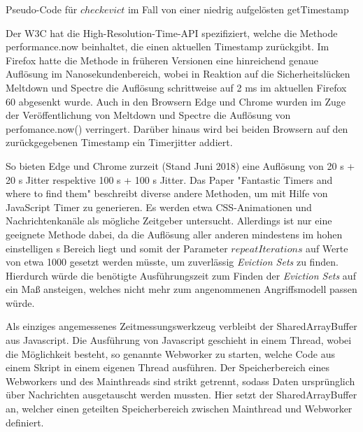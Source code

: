 \begin{algorithm}[h]
\DontPrintSemicolon
\caption{Pseudo-Code für $checkevict$ im Fall von einer niedrig aufgelösten getTimestamp}
\label{alg:checkevict_low_resolution}


\end{algorithm}

Der W3C hat die High-Resolution-Time-API spezifiziert, welche die Methode performance.now beinhaltet, die einen aktuellen Timestamp zurückgibt. Im Firefox hatte die Methode in früheren Versionen eine hinreichend genaue Auflösung im Nanosekundenbereich, wobei in Reaktion auf die Sicherheitslücken Meltdown und Spectre die Auflösung schrittweise auf 2 ms im aktuellen Firefox 60 abgesenkt wurde. 
Auch in den Browsern Edge und Chrome wurden im Zuge der Veröffentlichung von Meltdown und Spectre die Auflösung von perfomance.now() verringert.
Darüber hinaus wird bei beiden Browsern auf den zurückgegebenen Timestamp ein Timerjitter addiert.

So bieten Edge und Chrome zurzeit (Stand Juni 2018) eine Auflösung von 20 \textmu s + 20 \textmu s Jitter respektive 100 \textmu s + 100 \textmu s Jitter.
Das Paper "Fantastic Timers and where to find them" \cite{FantasticTimers} beschreibt diverse andere Methoden, um mit Hilfe von JavaScript Timer zu generieren. 
Es werden etwa CSS-Animationen und Nachrichtenkanäle als mögliche Zeitgeber untersucht.
Allerdings ist nur eine geeignete Methode dabei, da die Auflösung aller anderen mindestens im hohen einstelligen \textmu s Bereich liegt und somit der Parameter $repeatIterations$ auf Werte von etwa 1000 gesetzt werden müsste, um zuverlässig \textit{Eviction Sets} zu finden. 
Hierdurch würde die benötigte Ausführungszeit zum Finden der \textit{Eviction Sets} auf ein Maß ansteigen, welches nicht mehr zum angenommenen Angriffsmodell passen würde.


Als einziges angemessenes Zeitmessungswerkzeug verbleibt der SharedArrayBuffer aus Javascript. 
Die Ausführung von Javascript geschieht in einem Thread, wobei die Möglichkeit besteht, so genannte Webworker zu starten, welche Code aus einem Skript in einem eigenen Thread ausführen.
Der Speicherbereich eines Webworkers und des Mainthreads sind strikt getrennt, sodass Daten ursprünglich über Nachrichten ausgetauscht werden mussten. Hier setzt der SharedArrayBuffer an, welcher einen geteilten Speicherbereich zwischen Mainthread und Webworker definiert.

